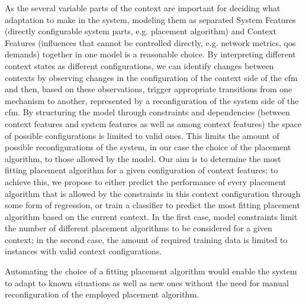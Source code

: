  As the several variable parts of the context are important for deciding what adaptation to make in the system, modeling them as separated System Features (directly configurable system parts, e.g. placement algorithm) and Context Features (influences that cannot be controlled directly, e.g. network metrics, \gls{qos} demands) together in one model is a reasonable choice.
 By interpreting different context states as different configurations, we can identify changes between contexts by observing changes in the configuration of the context side of the \gls{cfm} and then, based on these observations, trigger appropriate transitions from one mechanism to another, represented by a reconfiguration of the system side of the \gls{cfm}. 
 By structuring the model through constraints and dependencies (between context features and system features as well as among context features) the space of possible configurations is limited to valid ones. This limits the amount of possible reconfigurations of the system, in our case the choice of the placement algorithm, to those allowed by the model.  
 Our aim is to determine the most fitting placement algorithm for a given configuration of context features; to achieve this, we propose to either predict the performance of every placement algorithm that is allowed by the constraints in this context configuration through some form of regression, or train a classifier to predict the most fitting placement algorithm based on the current context. 
 In the first case, model constraints limit the number of different placement algorithms to be considered for a given context; in the second case, the amount of required training data is limited to instances with valid context configurations.
 
 Automating the choice of a fitting placement algorithm would enable the system to adapt to known situations as well as new ones without the need for manual reconfiguration of the employed placement algorithm. \\ \\


